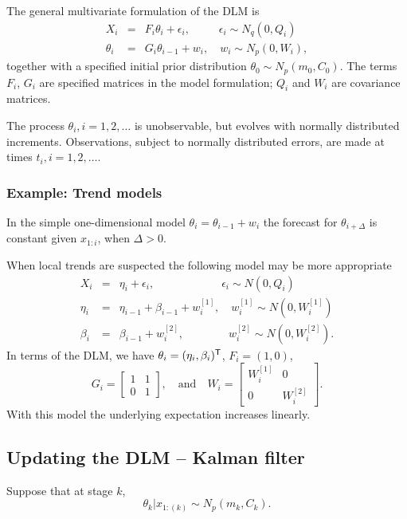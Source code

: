 The general multivariate formulation of the DLM is  
\begin{eqnarray}\label{eq:statespace}
X_i &=& F_i \theta_i + \epsilon_i, \qquad \;\; \epsilon_i \sim N_q(0,Q_i) \nonumber\\
\theta_i &=& G_i \theta_{i-1} + w_i, \quad w_i \sim N_p(0,W_i),
\end{eqnarray} 
together with a specified initial prior distribution $\theta_0 \sim N_p(m_0,C_0)$. The terms $F_i$, $G_i$ are specified matrices in the model formulation; $Q_i$ and $W_i$ are covariance matrices. 

The process $\theta_i, i=1,2,\dots $ is unobservable, but evolves with normally distributed increments. 
Observations, subject to normally distributed errors, are made at times $t_i, i=1,2,\dots$. 
\subsubsection*{Example: Trend models}
In the simple one-dimensional model $\theta_i = \theta_{i-1} + w_i$ the forecast for $\theta_{i+\Delta}$ is constant given $x_{1:i}$, when $\Delta > 0$. 

When local trends are suspected the following model may be more appropriate
\begin{eqnarray*}
X_i &=& \eta_i + \epsilon_i, \qquad \qquad \qquad \epsilon_i \sim N(0, Q_i)\\
\eta_i &=& \eta_{i-1} + \beta_{i-1} + w^{[1]}_i,  \quad w^{[1]}_i \sim N(0,W_i^{[1]})\\
\beta_i &=& \beta_{i-1} + w^{[2]}_i,  \qquad \qquad w^{[2]}_i \sim N(0,W_i^{[2]}).
\end{eqnarray*}
In terms of the DLM, we have $\theta_i = (\eta_i, \beta_i)^{\sf T}$, $F_i = (1,0)$,
$$ G_i = \begin{bmatrix}1 & 1 \\ 0 & 1 \end{bmatrix}, \quad \text{and} \quad W_i = \begin{bmatrix}W_i^{[1]} & 0\\0 & W_i^{[2]} \end{bmatrix}.$$ 
With this model the underlying expectation increases linearly.  
        
\subsection{Updating the DLM -- Kalman filter}\label{sec:updateKF}
Suppose that at stage $k$, $$\theta_{k}|x_{1:(k)} \sim N_p(m_{k},C_{k}).$$


